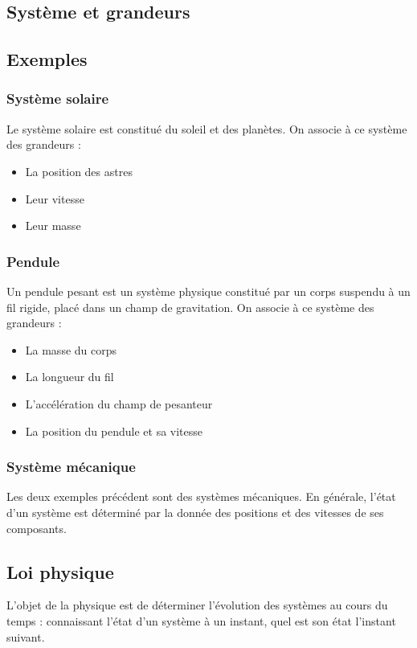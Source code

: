 
\begin{appendix}

\chapter{Système et grandeurs}

\section{Exemples}

\subsection{Système solaire}
Le système solaire est constitué du soleil et des planètes. On associe à ce système des grandeurs : 
\begin{itemize}[leftmargin=1cm, label=, itemsep=1pt]
\item La position des astres
\item Leur vitesse
\item Leur masse
\end{itemize}

\subsection{Pendule}
Un pendule pesant est un système physique constitué par un corps suspendu à un fil rigide, placé dans un champ de gravitation. On associe à ce système des grandeurs :
\begin{itemize}[leftmargin=1cm, label=, itemsep=1pt]
\item La masse du corps
\item La longueur du fil
\item L'accélération du champ de pesanteur
\item La position du pendule et sa vitesse
\end{itemize}

\subsection{Système mécanique}
Les deux exemples précédent sont des systèmes mécaniques. En générale, l'état d'un système est déterminé par la donnée des positions et des vitesses de ses composants.

\section{Loi physique}
L'objet de la physique est de déterminer l'évolution des systèmes au cours du temps : connaissant l'état d'un système à un instant, quel est son état l'instant suivant.


\end{appendix}
